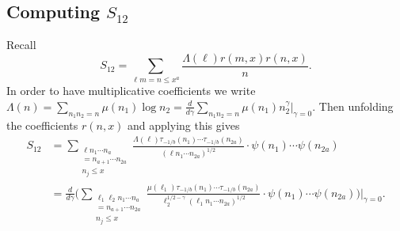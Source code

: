 \documentclass[oneside, 12pt]{amsart}
\theoremstyle{definition}
\newcommand{\leqs}{\leqslant }
\begin{document}
\subsection{Computing $S_{12}$}
Recall
\[
S_{12} = \sum_{\ell m=n\leqs x^a}\frac{\Lambda(\ell)r(m,x)r(n,x)}{n}.
\]
In order to have multiplicative coefficients we write  
$
\Lambda(n) = \sum_{n_1n_2=n}\mu(n_1)\log n_2 = \frac{d}{d\gamma} \sum_{n_1n_2=n}\mu(n_1)n_2^{\gamma} |_{\gamma=0} . 
$
Then unfolding the coefficients $r(n,x)$ and applying this gives
\begin{align*}
S_{12}
            & = \sum_{\substack{\ell n_1\cdots n_a\\=n_{a+1}\cdots n_{2a}\\ n_j\leqslant x}} \frac{\Lambda(\ell)\tau_{-1/b}(n_1)\cdots \tau_{-1/b}(n_{2a})}{ (\ell n_1\cdots n_{2a})^{1/2}} \cdot \psi(n_1)\cdots\psi(n_{2a}) \\
            & = \frac{d}{d\gamma} \bigg( \sum_{\substack{\ell_1\ell_2 n_1\cdots n_a\\=n_{a+1}\cdots n_{2a}\\ n_j\leqslant x}}  \frac{\mu(\ell_1)  \tau_{-1/b}(n_1) \cdots \tau_{-1/b}(n_{2a}) }{ \ell_2^{1/2-\gamma}(\ell_1n_1\cdots n_{2a})^{1/2}} \cdot \psi(n_1)\cdots\psi(n_{2a})  \bigg)\bigg|_{\gamma=0}.
\end{align*}

\end{document}

